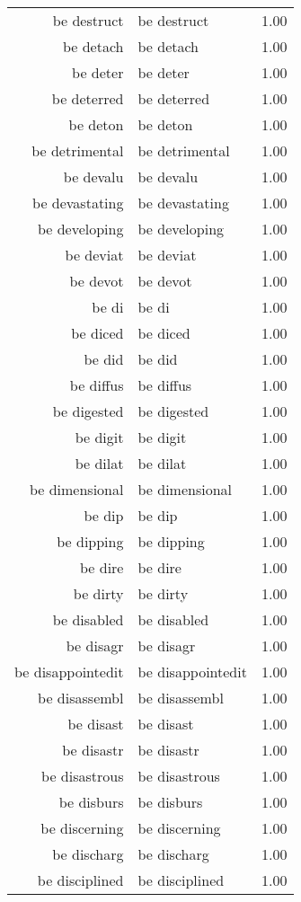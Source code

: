 \begin{table}[ht]
\begin{tabular}{rlr}
  be destruct & be destruct & 1.00 \\ 
  be detach & be detach & 1.00 \\ 
  be deter & be deter & 1.00 \\ 
  be deterred & be deterred & 1.00 \\ 
  be deton & be deton & 1.00 \\ 
  be detrimental & be detrimental & 1.00 \\ 
  be devalu & be devalu & 1.00 \\ 
  be devastating & be devastating & 1.00 \\ 
  be developing & be developing & 1.00 \\ 
  be deviat & be deviat & 1.00 \\ 
  be devot & be devot & 1.00 \\ 
  be di & be di & 1.00 \\ 
  be diced & be diced & 1.00 \\ 
  be did & be did & 1.00 \\ 
  be diffus & be diffus & 1.00 \\ 
  be digested & be digested & 1.00 \\ 
  be digit & be digit & 1.00 \\ 
  be dilat & be dilat & 1.00 \\ 
  be dimensional & be dimensional & 1.00 \\ 
  be dip & be dip & 1.00 \\ 
  be dipping & be dipping & 1.00 \\ 
  be dire & be dire & 1.00 \\ 
  be dirty & be dirty & 1.00 \\ 
  be disabled & be disabled & 1.00 \\ 
  be disagr & be disagr & 1.00 \\ 
  be disappointedit & be disappointedit & 1.00 \\ 
  be disassembl & be disassembl & 1.00 \\ 
  be disast & be disast & 1.00 \\ 
  be disastr & be disastr & 1.00 \\ 
  be disastrous & be disastrous & 1.00 \\ 
  be disburs & be disburs & 1.00 \\ 
  be discerning & be discerning & 1.00 \\ 
  be discharg & be discharg & 1.00 \\ 
  be disciplined & be disciplined & 1.00 \\ 

\end{tabular}
\end{table}
